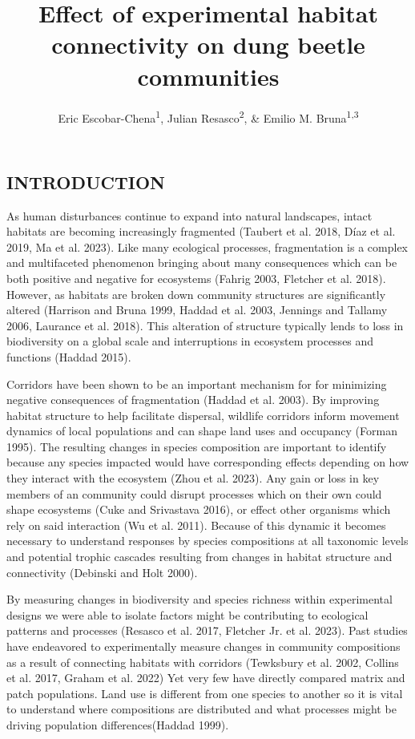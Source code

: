 \documentclass[
  man, donotrepeattitle]{apa6}
\title{Effect of experimental habitat connectivity on dung beetle communities}
\author{Eric Escobar-Chena\textsuperscript{1}, Julian Resasco\textsuperscript{2}, \& Emilio M. Bruna\textsuperscript{1,3}}
\date{}
\affiliation{\vspace{0.5cm}\textsuperscript{1} Department of Wildlife Ecology \& Conservation, University of Florida, PO Box 110530, Gainesville, Florida, 32611-0430 USA\\\textsuperscript{2} University of Colorado, Boulder\\\textsuperscript{3} Center for Latin American Studies, University of Florida, PO Box 110530, Gainesville, Florida, 32611-0530 USA}
\begin{document}
\maketitle

\subsection{INTRODUCTION}\label{introduction}

As human disturbances continue to expand into natural landscapes, intact habitats are becoming increasingly fragmented (Taubert et al. 2018, Díaz et al. 2019, Ma et al. 2023). Like many ecological processes, fragmentation is a complex and multifaceted phenomenon bringing about many consequences which can be both positive and negative for ecosystems (Fahrig 2003, Fletcher et al. 2018). However, as habitats are broken down community structures are significantly altered (Harrison and Bruna 1999, Haddad et al. 2003, Jennings and Tallamy 2006, Laurance et al. 2018). This alteration of structure typically lends to loss in biodiversity on a global scale and interruptions in ecosystem processes and functions (Haddad 2015).

Corridors have been shown to be an important mechanism for for minimizing negative consequences of fragmentation (Haddad et al. 2003). By improving habitat structure to help facilitate dispersal, wildlife corridors inform movement dynamics of local populations and can shape land uses and occupancy (Forman 1995). The resulting changes in species composition are important to identify because any species impacted would have corresponding effects depending on how they interact with the ecosystem (Zhou et al. 2023). Any gain or loss in key members of an community could disrupt processes which on their own could shape ecosystems (Cuke and Srivastava 2016), or effect other organisms which rely on said interaction (Wu et al. 2011). Because of this dynamic it becomes necessary to understand responses by species compositions at all taxonomic levels and potential trophic cascades resulting from changes in habitat structure and connectivity (Debinski and Holt 2000).

By measuring changes in biodiversity and species richness within experimental designs we were able to isolate factors might be contributing to ecological patterns and processes (Resasco et al. 2017, Fletcher Jr. et al. 2023). Past studies have endeavored to experimentally measure changes in community compositions as a result of connecting habitats with corridors (Tewksbury et al. 2002, Collins et al. 2017, Graham et al. 2022) Yet very few have directly compared matrix and patch populations. Land use is different from one species to another so it is vital to understand where compositions are distributed and what processes might be driving population differences(Haddad 1999).
\end{document}
